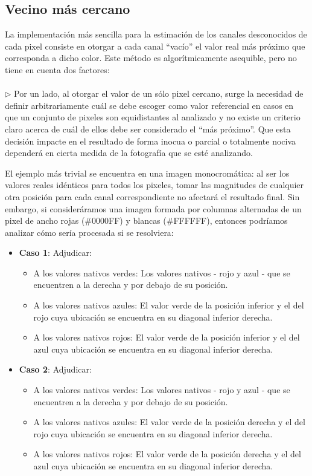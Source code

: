 \documentclass[a4paper]{article}
\begin{document}
\subsection{Vecino m\'as cercano}
La implementación más sencilla para la estimación de los canales desconocidos de cada pixel consiste en otorgar a cada canal ``vacío'' el valor real m\'as pr\'oximo que corresponda a dicho color. Este m\'etodo es algor\'itmicamente asequible, pero no tiene en cuenta dos factores: \\
\\

$\triangleright$ Por un lado, al otorgar el valor de un sólo pixel cercano, surge la necesidad de definir arbitrariamente cuál se debe escoger como valor referencial en casos en que un conjunto de pixeles son equidistantes al analizado y no existe un criterio claro acerca de cuál de ellos debe ser considerado el ``más próximo''. Que esta decisión impacte en el resultado de forma inocua o parcial o totalmente nociva dependerá en cierta medida de la fotografía que se esté analizando.

El ejemplo más trivial se encuentra en una imagen monocromática: al ser los valores reales idénticos para todos los pixeles, tomar las magnitudes de cualquier otra posición para cada canal correspondiente no afectará el resultado final. Sin embargo, si consideráramos una imagen formada por columnas alternadas de un pixel de ancho rojas (\#0000FF) y blancas (\#FFFFFF), entonces podríamos analizar cómo sería procesada si se resolviera:

\begin{itemize}
\item \textbf{Caso 1}: 
    Adjudicar:
\begin{itemize}
\item   A los valores nativos verdes: Los valores nativos - rojo y azul - que se encuentren a la derecha y por debajo de su posición.
\item   A los valores nativos azules: El valor verde de la posición inferior y el del rojo  cuya ubicación se encuentra en su diagonal inferior derecha.
\item   A los valores nativos rojos: El valor verde de la posición inferior y el del azul cuya ubicación se encuentra en su diagonal inferior derecha.  
\end{itemize}

\item \textbf{Caso 2}: 
    Adjudicar:
\begin{itemize}
\item   A los valores nativos verdes: Los valores nativos - rojo y azul - que se encuentren a la derecha y por debajo de su posición.
\item   A los valores nativos azules: El valor verde de la posición derecha y el del rojo cuya ubicación se encuentra en su diagonal inferior derecha.
\item   A los valores nativos rojos: El valor verde de la posición derecha y el del azul  cuya ubicación se encuentra en su diagonal inferior derecha.
\end{itemize}

    
\end{itemize}
\end{document}
